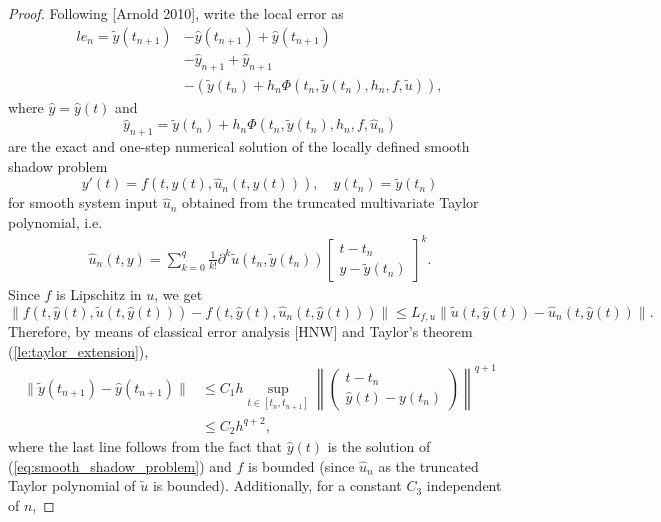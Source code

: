 \documentclass{book}
\theoremstyle{definition}
\begin{document}
\begin{proof}
    Following [Arnold 2010], write the local error as
    \begin{align*}
        le_{n} = \tilde{y}(t_{n+1}) &- \hat{y}(t_{n+1}) + \hat{y}(t_{n+1}) \\
        &-\hat{y}_{n+1} + \hat{y}_{n+1} \\
        &-(\tilde{y}(t_{n}) + h_{n} \Phi (t_{n}, \tilde{y}(t_{n}), h_{n}, f, \tilde{u}) ),
    \end{align*}
    where $\hat{y} = \hat{y}(t)$ and 
    \[
        \hat{y}_{n+1} = \tilde{y}(t_{n}) + h_{n} \Phi (t_{n}, \tilde{y}(t_{n}), h_{n}, f, \hat{u}_{n})
    \] 
    are the exact and one-step numerical solution of the locally defined smooth shadow problem
    \begin{equation}\label{eq:smooth_shadow_problem}
        y'(t) = f(t, y(t), \hat{u}_n(t, y(t))),\quad y(t_{n}) = \tilde{y}(t_{n}) 
    \end{equation}
    for smooth system input $\hat{u}_n$ obtained from the truncated multivariate Taylor polynomial, i.e.
    \begin{align}
        \hat{u}_n(t, y) = \sum_{k=0}^{q} \frac{1}{k!} \partial^{k}\tilde{u}(t_{n}, \tilde{y}(t_{n})) \begin{bmatrix}
            t - t_{n} \\
            y - \tilde{y}(t_{n})
        \end{bmatrix}^{k}.
    \end{align}
    Since $f$ is Lipschitz in $u$, we get
    \[
        \lVert f(t, \hat{y}(t), \tilde{u}(t, \hat{y}(t))) - f(t, \hat{y}(t), \hat{u}_n(t, \hat{y}(t))) \rVert \leq L_{f, u} \lVert \tilde{u}(t, \hat{y}(t)) - \hat{u}_n(t, \hat{y}(t)) \rVert. 
    \]
    Therefore, by means of classical error analysis [HNW] and Taylor's theorem (\ref{le:taylor_extension}),
    \begin{align}\label{eq:one_step_local_error_partA}
        \lVert \tilde{y}(t_{n+1}) - \hat{y}(t_{n+1}) \rVert 
        &\leq C_{1}h \sup_{t\in[t_{n}, t_{n+1}]}\left\lVert \begin{pmatrix}
            t-t_{n} \\
            \hat{y}(t) - y(t_{n})
        \end{pmatrix} \right\rVert^{q+1} \nonumber\\
        &\leq C_{2}h^{q+2},
    \end{align}
    where the last line follows from the fact that $\hat{y}(t)$ is the solution of (\ref{eq:smooth_shadow_problem}) and $f$ is bounded (since $\hat{u}_{n}$ as the truncated Taylor polynomial of $\tilde{u}$ is bounded). Additionally, for a constant $C_{3}$ independent of $n$, 

\end{proof}
\end{document}
